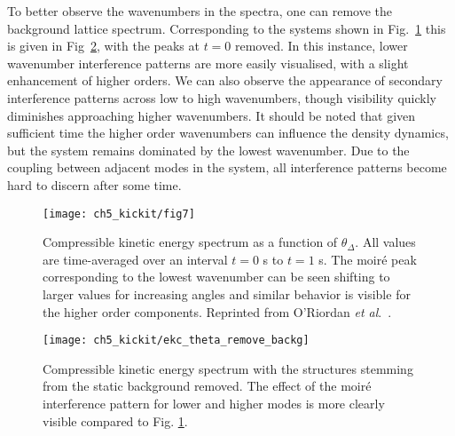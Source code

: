     To better observe the wavenumbers in the spectra, one can remove the background lattice spectrum. Corresponding to the systems shown in Fig.~\ref{fig:dtheta_kspec} this is given in Fig~\ref{fig:dtheta_kspec_backg}, with the peaks at $t=0$ removed. In this instance, lower wavenumber interference patterns are more easily visualised, with a slight enhancement of higher orders. We can also observe the appearance of secondary interference patterns across low to high wavenumbers, though visibility quickly diminishes approaching higher wavenumbers. It should be noted that given sufficient time the higher order wavenumbers can influence the density dynamics, but the system remains dominated by the lowest wavenumber. Due to the coupling between adjacent modes in the system, all interference patterns become hard to discern after some time. %


	\begin{figure}
        \centering
		\texttt{[image: ch5\_kickit/fig7]}
		\caption[Compressible kinetic energy spectrum as a function of $\theta_\Delta$.]{Compressible kinetic energy spectrum as a function of $\theta_\Delta$. All values are time-averaged over an interval $t=0$ s to $t=1$ s. The moir\'e peak corresponding to the lowest wavenumber can be seen shifting to larger values for increasing angles and similar behavior is visible for the higher order components. Reprinted from O'Riordan {\textit{et al}.}~\cite{VTX:oriordan_pra_2016}.}
		\label{fig:dtheta_kspec}
	\end{figure}
    \begin{figure}
        \centering
        \texttt{[image: ch5\_kickit/ekc\_theta\_remove\_backg]}
        \caption[Compressible kinetic energy spectrum with the background structure removed.]{Compressible kinetic energy spectrum with the structures stemming from the static background removed. The effect of the moir\'e interference pattern for lower and higher modes is more clearly visible compared to Fig. \ref{fig:dtheta_kspec}.}
        \label{fig:dtheta_kspec_backg}
    \end{figure}

